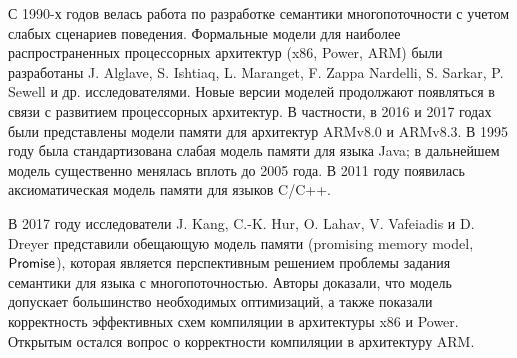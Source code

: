 
{\progress}
С 1990-х годов велась работа по
разработке семантики многопоточности с учетом слабых сценариев поведения.
Формальные модели для наиболее распространенных процессорных архитектур (x86, Power, ARM)
были разработаны J. Alglave, S. Ishtiaq, L. Maranget, F. Zappa Nardelli, S. Sarkar, P. Sewell и др.
исследователями.
Новые версии моделей продолжают появляться в связи с развитием процессорных архитектур.
В частности, в 2016 и 2017 годах были представлены модели памяти для архитектур ARMv8.0 и
ARMv8.3.
В 1995 году была стандартизована слабая модель памяти для языка Java;
в дальнейшем модель существенно менялась вплоть до 2005 года.
В 2011 году появилась аксиоматическая модель памяти для языков C/C++.

В 2017 году исследователи J. Kang, C.-K. Hur, O. Lahav, V. Vafeiadis и D. Dreyer
представили обещающую модель памяти (promising memory model, $\mathsf{Promise}$), которая является перспективным
решением проблемы задания семантики для языка с многопоточностью. Авторы 
доказали, что модель допускает большинство необходимых оптимизаций, а также показали корректность
эффективных схем компиляции в архитектуры x86 и Power. Открытым остался вопрос о корректности компиляции
в архитектуру ARM.

